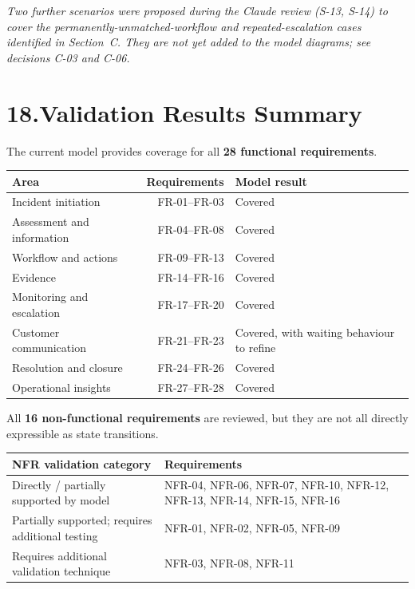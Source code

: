 \documentclass[11pt,a4paper]{article}
\begin{document}
\textit{Two further scenarios were proposed during the Claude review (S-13, S-14) to cover the permanently-unmatched-workflow and repeated-escalation cases identified in Section~C. They are not yet added to the model diagrams; see decisions C-03 and C-06.}

\section*{18.\enspace Validation Results Summary}

The current model provides coverage for all \textbf{28 functional requirements}.

\begin{center}
\small
\begin{tabularx}{\textwidth}{@{} l r X @{}}
\toprule
\textbf{Area} & \textbf{Requirements} & \textbf{Model result} \\
\midrule
Incident initiation        & FR-01–FR-03 & Covered \\
Assessment and information & FR-04–FR-08 & Covered \\
Workflow and actions       & FR-09–FR-13 & Covered \\
Evidence                   & FR-14–FR-16 & Covered \\
Monitoring and escalation  & FR-17–FR-20 & Covered \\
Customer communication     & FR-21–FR-23 & Covered, with waiting behaviour to refine \\
Resolution and closure     & FR-24–FR-26 & Covered \\
Operational insights       & FR-27–FR-28 & Covered \\
\bottomrule
\end{tabularx}
\end{center}

All \textbf{16 non-functional requirements} are reviewed, but they are not all directly expressible as state transitions.

\begin{center}
\small
\begin{tabularx}{\textwidth}{@{} X l @{}}
\toprule
\textbf{NFR validation category} & \textbf{Requirements} \\
\midrule
Directly / partially supported by model & NFR-04, NFR-06, NFR-07, NFR-10, NFR-12, NFR-13, NFR-14, NFR-15, NFR-16 \\
Partially supported; requires additional testing & NFR-01, NFR-02, NFR-05, NFR-09 \\
Requires additional validation technique & NFR-03, NFR-08, NFR-11 \\
\bottomrule
\end{tabularx}
\end{center}
\end{document}
